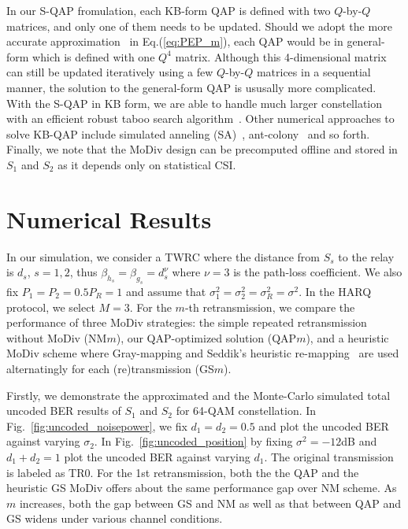 \documentclass{article}
\begin{document}
In our S-QAP fromulation, each KB-form QAP is defined with two $Q$-by-$Q$
matrices, and only one of them needs to be updated. Should we adopt the more
accurate approximation~\cite{chiani2003new} in Eq.(\ref{eq:PEP_m}), each QAP
would be in general-form which is defined with one $Q^4$ matrix. Although this
4-dimensional matrix can still be updated iteratively using a few
$Q$-by-$Q$ matrices in a sequential manner, the solution to the general-form QAP
is ususally more complicated. With the S-QAP in KB form, we are able
to handle much larger constellation with an efficient robust taboo search
algorithm~\cite{taillard1991robust}. Other numerical approaches to
solve KB-QAP include simulated anneling (SA)~\cite{connolly1990improved},
ant-colony~\cite{gambardella1999ant} and so forth. Finally, we note that the
MoDiv design can be precomputed offline and stored in $S_1$ and $S_2$ as it
depends only on statistical CSI.

\section{Numerical Results}
\label{sec:numerical}
In our simulation, we consider a TWRC where the distance from $S_s$ to the relay
is $d_s$, $s=1,2$, thus $\beta_{h_s} = \beta_{g_s} = d_s^{\nu}$ where $\nu=3$ is
the path-loss coefficient. We also fix $P_1=P_2=0.5P_R=1$ and assume that
$\sigma_1^2 = \sigma_2^2=\sigma_R^2 = \sigma^2$. In the HARQ protocol, we
select $M=3$. For the $m$-th
retransmission, we compare the performance of three MoDiv strategies: the simple
repeated retransmission without MoDiv (NM$m$), our QAP-optimized solution
(QAP$m$), and a heuristic MoDiv scheme where Gray-mapping and Seddik's heuristic
re-mapping~\cite{seddik2008trans} are used alternatingly for each
(re)transmission (GS$m$).

Firstly, we demonstrate the approximated and the Monte-Carlo simulated
total uncoded BER results of $S_1$ and $S_2$ for 64-QAM constellation. In
Fig.~\ref{fig:uncoded_noisepower}, we fix $d_1=d_2=0.5$ and plot the uncoded BER
against varying $\sigma_2$. In Fig.~\ref{fig:uncoded_position} by fixing
$\sigma^2=-12$dB and $d_1+d_2=1$ plot the uncoded BER against varying $d_1$. The
original transmission is labeled as TR0. For the 1st retransmission, both the
the QAP and the heuristic GS MoDiv offers about the same performance gap over NM
scheme. As $m$ increases, both the gap between GS and NM as well as that
between QAP and GS widens under various channel conditions.
\end{document}

